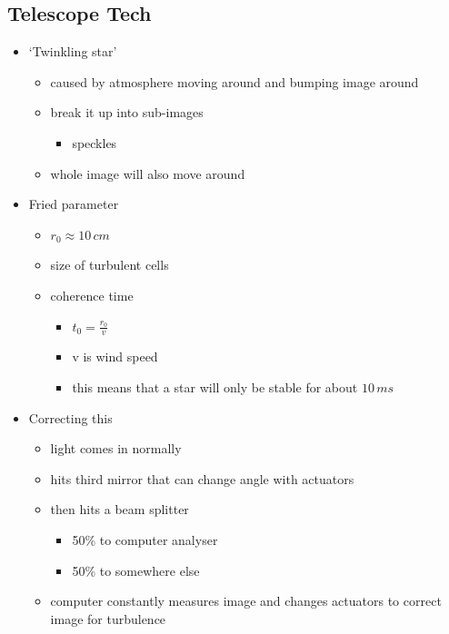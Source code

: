 \documentclass[a4paper,11pt,normalem]{article}
\begin{document}
\subsection{Telescope Tech}

\begin{itemize}
    \item `Twinkling star'
        \begin{itemize}
            \item caused by atmosphere moving around and bumping image around
            \item break it up into sub-images
                \begin{itemize}
                    \item speckles
                \end{itemize}
            \item whole image will also move around
        \end{itemize}
    \item Fried parameter
        \begin{itemize}
            \item \(r_0 \approx 10\,cm\)
            \item size of turbulent cells
            \item coherence time
                \begin{itemize}
                    \item \(t_0 = \frac{r_0}{v}\)
                    \item v is wind speed
                    \item this means that a star will only be stable for about \(10\, ms\)
                \end{itemize}
        \end{itemize}
    \item Correcting this
        \begin{itemize}
            \item light comes in normally
            \item hits third mirror that can change angle with actuators
            \item then hits a beam splitter
                \begin{itemize}
                    \item 50\% to computer analyser
                    \item 50\% to somewhere else
                \end{itemize}
            \item computer constantly measures image and changes actuators to correct image for turbulence

\end{itemize}
\end{itemize}
\end{document}
